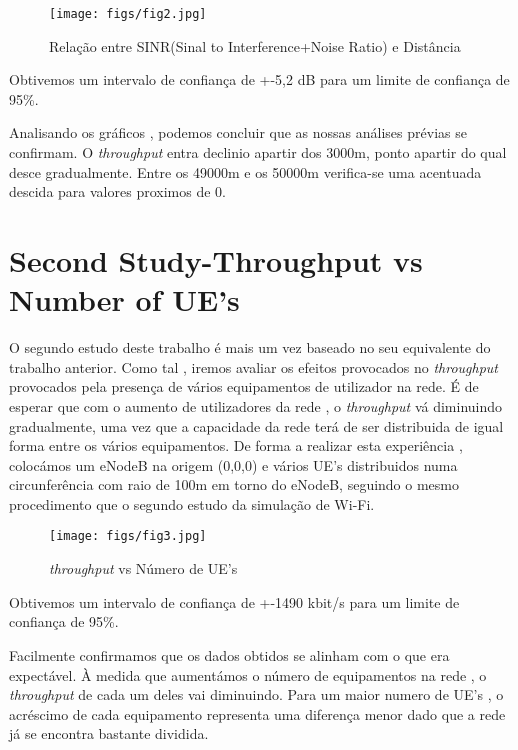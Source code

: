 \begin{figure}[H]
    \centering
    \texttt{[image: figs/fig2.jpg]}
    \caption{Relação entre SINR(Sinal to Interference+Noise Ratio) e Distância}
    \label{fig:2}
\end{figure}
Obtivemos um intervalo de confiança de +-5,2 dB para um limite de confiança de 95\%.

Analisando os gráficos , podemos concluir que as nossas análises prévias se confirmam. O \textit{throughput} entra declinio apartir 
dos 3000m, ponto apartir do qual desce gradualmente. Entre os 49000m e os 50000m verifica-se uma acentuada descida para valores proximos de 0.

\clearpage


\section{Second Study-Throughput vs Number of UE's} \label{ex2}
    O segundo estudo deste trabalho é mais um vez baseado no seu equivalente do trabalho anterior.
Como tal , iremos avaliar os efeitos provocados no \textit{throughput} provocados pela 
presença de vários equipamentos de utilizador na rede. 
    É de esperar que com o aumento de utilizadores da rede , o \textit{throughput} vá diminuindo
gradualmente, uma vez que a capacidade da rede terá de ser distribuida de igual forma entre os vários
equipamentos.
    De forma a realizar esta experiência , colocámos um eNodeB na origem (0,0,0) e vários UE's distribuidos
numa circunferência com raio de 100m em torno do eNodeB, seguindo o mesmo procedimento que o segundo estudo 
da simulação de Wi-Fi.

\begin{figure}[H]
    \centering
    \texttt{[image: figs/fig3.jpg]}
    \caption{\textit{throughput} vs Número de UE's}
    \label{fig:3}
\end{figure}
Obtivemos um intervalo de confiança de +-1490 kbit/s para um limite de confiança de 95\%.

    Facilmente confirmamos que os dados obtidos se alinham com o que era expectável. À medida
que aumentámos o número de equipamentos na rede , o \textit{throughput} de cada um deles vai diminuindo.
Para um maior numero de UE's , o acréscimo de cada equipamento representa uma diferença menor dado que a rede
já se encontra bastante dividida.


\clearpage





